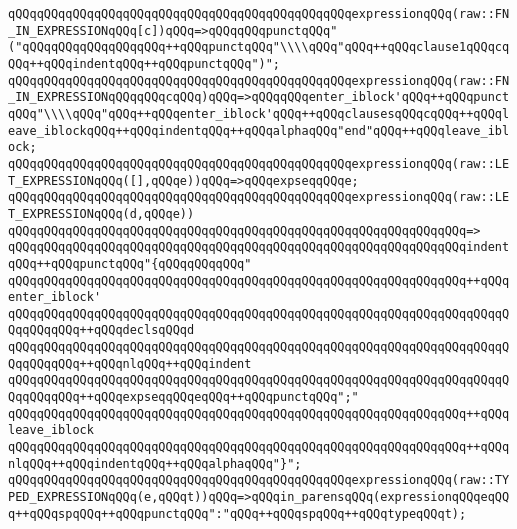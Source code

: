 \verb|qQQqqQQqqQQqqQQqqQQqqQQqqQQqqQQqqQQqqQQqqQQqqQQqexpressionqQQq(raw::FN_IN_EXPRESSIONqQQq[c])qQQq=>qQQqqQQqpunctqQQq"("qQQqqQQqqQQqqQQqqQQq++qQQqpunctqQQq"\\\\qQQq"qQQq++qQQqclause1qQQqcqQQq++qQQqindentqQQq++qQQqpunctqQQq")";|\newline
\verb|qQQqqQQqqQQqqQQqqQQqqQQqqQQqqQQqqQQqqQQqqQQqqQQqexpressionqQQq(raw::FN_IN_EXPRESSIONqQQqqQQqcqQQq)qQQq=>qQQqqQQqenter_iblock'qQQq++qQQqpunctqQQq"\\\\qQQq"qQQq++qQQqenter_iblock'qQQq++qQQqclausesqQQqcqQQq++qQQqleave_iblockqQQq++qQQqindentqQQq++qQQqalphaqQQq"end"qQQq++qQQqleave_iblock;|\newline
\newline
\verb|qQQqqQQqqQQqqQQqqQQqqQQqqQQqqQQqqQQqqQQqqQQqqQQqexpressionqQQq(raw::LET_EXPRESSIONqQQq([],qQQqe))qQQq=>qQQqexpseqqQQqe;|\newline
\newline
\verb|qQQqqQQqqQQqqQQqqQQqqQQqqQQqqQQqqQQqqQQqqQQqqQQqexpressionqQQq(raw::LET_EXPRESSIONqQQq(d,qQQqe))|\newline
\verb|qQQqqQQqqQQqqQQqqQQqqQQqqQQqqQQqqQQqqQQqqQQqqQQqqQQqqQQqqQQqqQQq=>|\newline
\verb|qQQqqQQqqQQqqQQqqQQqqQQqqQQqqQQqqQQqqQQqqQQqqQQqqQQqqQQqqQQqqQQqindentqQQq++qQQqpunctqQQq"{qQQqqQQqqQQq"|\newline
\verb|qQQqqQQqqQQqqQQqqQQqqQQqqQQqqQQqqQQqqQQqqQQqqQQqqQQqqQQqqQQqqQQq++qQQqenter_iblock'|\newline
\verb|qQQqqQQqqQQqqQQqqQQqqQQqqQQqqQQqqQQqqQQqqQQqqQQqqQQqqQQqqQQqqQQqqQQqqQQqqQQqqQQq++qQQqdeclsqQQqd|\newline
\verb|qQQqqQQqqQQqqQQqqQQqqQQqqQQqqQQqqQQqqQQqqQQqqQQqqQQqqQQqqQQqqQQqqQQqqQQqqQQqqQQq++qQQqnlqQQq++qQQqindent|\newline
\verb|qQQqqQQqqQQqqQQqqQQqqQQqqQQqqQQqqQQqqQQqqQQqqQQqqQQqqQQqqQQqqQQqqQQqqQQqqQQqqQQq++qQQqexpseqqQQqeqQQq++qQQqpunctqQQq";"|\newline
\verb|qQQqqQQqqQQqqQQqqQQqqQQqqQQqqQQqqQQqqQQqqQQqqQQqqQQqqQQqqQQqqQQq++qQQqleave_iblock|\newline
\verb|qQQqqQQqqQQqqQQqqQQqqQQqqQQqqQQqqQQqqQQqqQQqqQQqqQQqqQQqqQQqqQQq++qQQqnlqQQq++qQQqindentqQQq++qQQqalphaqQQq"}";|\newline
\newline
\verb|qQQqqQQqqQQqqQQqqQQqqQQqqQQqqQQqqQQqqQQqqQQqqQQqexpressionqQQq(raw::TYPED_EXPRESSIONqQQq(e,qQQqt))qQQq=>qQQqin_parensqQQq(expressionqQQqeqQQq++qQQqspqQQq++qQQqpunctqQQq":"qQQq++qQQqspqQQq++qQQqtypeqQQqt);|\newline
